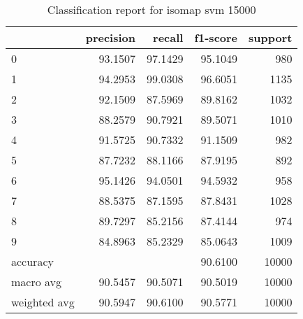 \begin{table}[htb!]
\centering
\begin{tabular}{lrrrr}
    \toprule
 & precision & recall & f1-score & support \\
\midrule
0 & 93.1507 & 97.1429 & 95.1049 & 980 \\
1 & 94.2953 & 99.0308 & 96.6051 & 1135 \\
2 & 92.1509 & 87.5969 & 89.8162 & 1032 \\
3 & 88.2579 & 90.7921 & 89.5071 & 1010 \\
4 & 91.5725 & 90.7332 & 91.1509 & 982 \\
5 & 87.7232 & 88.1166 & 87.9195 & 892 \\
6 & 95.1426 & 94.0501 & 94.5932 & 958 \\
7 & 88.5375 & 87.1595 & 87.8431 & 1028 \\
8 & 89.7297 & 85.2156 & 87.4144 & 974 \\
9 & 84.8963 & 85.2329 & 85.0643 & 1009 \\
accuracy & & & 90.6100 & 10000\\
macro avg & 90.5457 & 90.5071 & 90.5019 & 10000 \\
weighted avg & 90.5947 & 90.6100 & 90.5771 & 10000 \\
\bottomrule
\end{tabular}
\caption{Classification report for isomap svm 15000}
\label{tab:classification-report-isomap_svm_15000}
\end{table}
